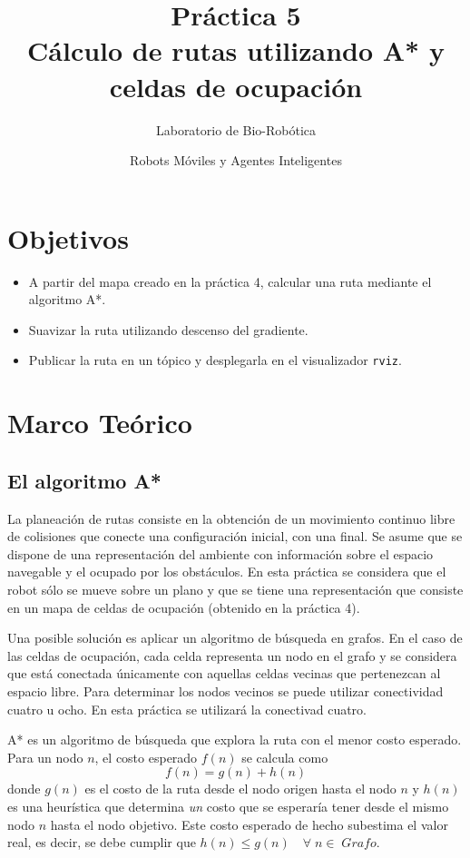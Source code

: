 \documentclass[letterpaper,12pt]{article}
\title{Práctica 5  \\ Cálculo de rutas utilizando A* y celdas de ocupación}
\author{Laboratorio de Bio-Robótica}
\date{Robots Móviles y Agentes Inteligentes}
\begin{document}
\renewcommand{\tablename}{Tabla}
\maketitle
\section*{Objetivos}
\begin{itemize}
\item A partir del mapa creado en la práctica 4, calcular una ruta mediante el algoritmo A*.
\item Suavizar la ruta utilizando descenso del gradiente. 
\item Publicar la ruta en un tópico y desplegarla en el visualizador \texttt{rviz}.
\end{itemize}

\section{Marco Teórico}
\subsection{El algoritmo A*}
La planeación de rutas consiste en la obtención de un movimiento continuo libre de colisiones que conecte una configuración inicial, con una final. Se asume que se dispone de una representación del ambiente con información sobre el espacio navegable y el ocupado por los obstáculos. En esta práctica se considera que el robot sólo se mueve sobre un plano y que se tiene una representación que consiste en un mapa de celdas de ocupación (obtenido en la práctica 4). 

Una posible solución es aplicar un algoritmo de búsqueda en grafos. En el caso de las celdas de ocupación, cada celda representa un nodo en el grafo y se considera que está conectada únicamente con aquellas celdas vecinas que pertenezcan al espacio libre. Para determinar los nodos vecinos se puede utilizar conectividad cuatro u ocho. En esta práctica se utilizará la conectivad cuatro. 

A* es un algoritmo de búsqueda que explora la ruta con el menor costo esperado. Para un nodo $n$, el costo esperado $f(n)$ se calcula como 
\[f(n) = g(n) + h(n)\]
donde $g(n)$ es el costo de la ruta desde el nodo origen hasta el nodo $n$ y $h(n)$ es una heurística que determina \textit{un} costo que se esperaría tener desde el mismo nodo $n$ hasta el nodo objetivo. Este costo esperado de hecho subestima el valor real, es decir, se debe cumplir que $h(n) \leq g(n)\quad \forall\; n \in\; Grafo$. 
\end{document}
